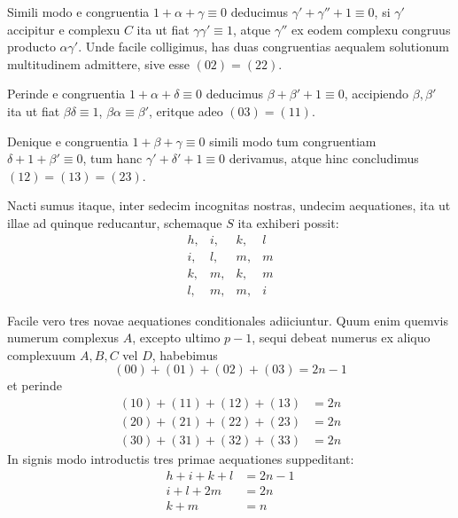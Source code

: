 Simili modo e congruentia $1+\alpha+\gamma\equiv0$ deducimus $\gamma'+\gamma''+1\equiv0$, si $\gamma'$ accipitur e complexu $C$ ita ut fiat $\gamma\gamma'\equiv1$, atque $\gamma''$ ex eodem complexu congruus producto $\alpha\gamma'$. Unde facile colligimus, has duas congruentias aequalem solutionum multitudinem admittere, sive esse $(02)=(22)$.

Perinde e congruentia $1+\alpha+\delta\equiv0$ deducimus $\beta+\beta'+1\equiv0$, accipiendo $\beta,\beta'$ ita ut fiat $\beta\delta\equiv1$, $\beta\alpha\equiv\beta'$, eritque adeo $(03)=(11)$.

Denique e congruentia $1+\beta+\gamma\equiv0$ simili modo tum congruentiam $\delta+1+\beta'\equiv0$, tum hanc $\gamma'+\delta'+1\equiv0$ derivamus, atque hinc concludimus $(12)=(13)=(23)$.

Nacti sumus itaque, inter sedecim incognitas nostras, undecim aequationes, ita ut illae ad quinque reducantur, schemaque $S$ ita exhiberi possit:
\[
\begin{array}{llll}
h,&i,&k,&l\\
i,&l,&m,&m\\
k,&m,&k,&m\\
l,&m,&m,&i
\end{array}
\]

Facile vero tres novae aequationes conditionales adiiciuntur. Quum enim quemvis numerum complexus $A$, excepto ultimo $p-1$, sequi debeat numerus ex aliquo complexuum $A,B,C$ vel $D$, habebimus
\[
(00)+(01)+(02)+(03)=2n-1
\]
et perinde
\[
\begin{aligned}
(10)+(11)+(12)+(13)&=2n\\
(20)+(21)+(22)+(23)&=2n\\
(30)+(31)+(32)+(33)&=2n
\end{aligned}
\]
In signis modo introductis tres primae aequationes suppeditant:
\[
\begin{aligned}
h+i+k+l&=2n-1\\
i+l+2m&=2n\\
k+m&=n
\end{aligned}
\]

